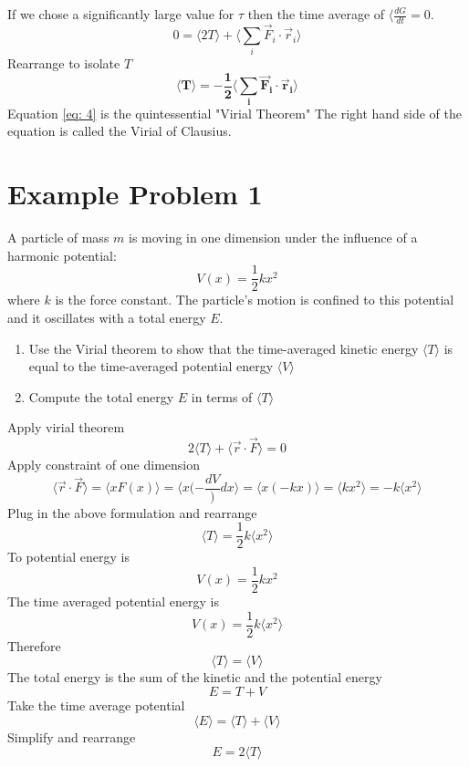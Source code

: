 \documentclass[12pt]{article}
\begin{document}
    If we chose a significantly large value for $\tau$ then the time average of $\langle \frac{d G}{dt} = 0$. 
    \begin{equation} \label{eq: 3}
        0 = \langle 2T \rangle + \langle \sum_i \Vec{F}_i \cdot \Vec{r}_i \rangle
    \end{equation}
    Rearrange to isolate $T$
    \begin{equation} \label{eq: 4}
        \boxed{\boldsymbol{\langle T \rangle = - \frac{1}{2} \langle \sum_i \Vec{F}_i \cdot \Vec{r}_i \rangle}}
    \end{equation}
    Equation \ref{eq: 4} is the quintessential "Virial Theorem"
    \newline The right hand side of the equation is called the Virial of Clausius.

\section{Example Problem 1}
    A particle of mass $m$ is moving in one dimension under the influence of a harmonic potential:
    \[
        V(x) = \frac{1}{2} k x^2
    \]
    where $k$ is the force constant. The particle's motion is confined to this potential and it oscillates with a total energy $E$.
    \begin{enumerate}
        \item Use the Virial theorem to show that the time-averaged kinetic energy $\langle T \rangle$ is equal to the time-averaged potential energy $\langle V \rangle$
        \item Compute the total energy $E$ in terms of $\langle T \rangle$
    \end{enumerate}

    \newline Apply virial theorem
    \[
        2 \langle T \rangle + \langle \vec{r} \cdot \vec{F} \rangle = 0
    \]
    Apply constraint of one dimension
    \[
        \langle \vec{r} \cdot \vec{F} \rangle = \langle x F(x) \rangle = \langle x (-\frac{dV}){dx} \rangle = \langle x (-kx) \rangle = \langle kx^2 \rangle = - k \langle x^2 \rangle
    \]
    Plug in the above formulation and rearrange
    \[
        \langle T \rangle  = \frac{1}{2} k \langle x^2 \rangle
    \]
    To potential energy is
    \[
        V(x) = \frac{1}{2} k x^2
    \]
    The time averaged potential energy is 
    \[
        V(x) = \frac{1}{2} k \langle x^2 \rangle
    \]
    Therefore 
    \[
        \boxed{\langle T \rangle = \langle V \rangle}
    \]
    The total energy is the sum of the kinetic and the potential energy
    \[
        E = T + V
    \]
    Take the time average potential
    \[
        \langle E \rangle = \langle T \rangle + \langle V \rangle
    \]
    Simplify and rearrange
    \[
        E = 2 \langle T \rangle 
    \]
\end{document}
